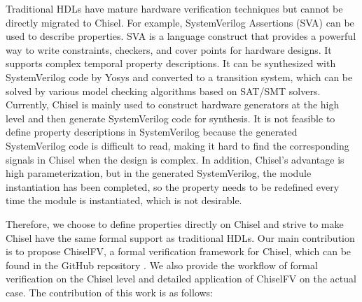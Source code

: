 \documentclass[conference]{IEEEtran}
\theoremstyle{definition}
\begin{document}
Traditional HDLs have mature hardware verification techniques but cannot be directly migrated to Chisel.
For example, SystemVerilog Assertions (SVA) \cite{vijayaraghavan2005practical} can be used to describe properties. SVA is a language construct that provides a powerful way to write constraints, checkers, and cover points for hardware designs. It supports complex temporal property descriptions. It can be synthesized with SystemVerilog code by Yosys \cite{wolf2016yosys} and converted to a transition system, which can be solved by various model checking algorithms based on SAT/SMT solvers.
Currently, Chisel is mainly used to construct hardware generators at the high level and then generate SystemVerilog code for synthesis. It is not feasible to define property descriptions in SystemVerilog because the generated SystemVerilog code is difficult to read, making it hard to find the corresponding signals in Chisel when the design is complex. In addition, Chisel's advantage is high parameterization, but in the generated SystemVerilog, the module instantiation has been completed, so the property needs to be redefined every time the module is instantiated, which is not desirable.

Therefore, we choose to define properties directly on Chisel and strive to make Chisel have the same formal support as traditional HDLs. 
Our main contribution is to propose ChiselFV, a formal verification framework for Chisel, which can be found in the GitHub repository \cite{ChiselFV}.
We also provide the workflow of formal verification on the Chisel level and detailed application of ChiselFV on the actual case. The contribution of this work is as follows:
\end{document}
